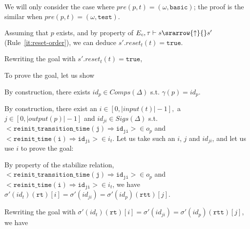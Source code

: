 \documentclass[dvipsnames,12pt]{article}
\begin{document}
\begin{niproof}
\begin{itemize}
\begin{itemize}
\begin{itemize}
        We will only consider the case where
        $pre(p,t)=(\omega,\mathtt{basic})$; the proof is the similar
        when $pre(p,t)=(\omega,\mathtt{test})$.

        Assuming that $p$ exists, and by property of
        $E_c,\tau\vdash{}s\srarrow{\uparrow}{\fontsize{7}{7}\selectfont}s'$
        (Rule~\ref{it:reset-order}), we can deduce
        $s'.reset_t(t)=\mathtt{true}$.

        Rewriting the goal with $s'.reset_t(t)=\mathtt{true}$,

        \noindent{}To prove the goal, let us show

        By construction, there exists $id_p\in{}Comps(\Delta)$
        s.t. $\gamma(p)=id_p$.

        \exP{}

        By construction, there exist an
        $i\in{}[0,\vert{}input(t)\vert-1],$ a
        $j\in[0,\vert{}output(p)\vert-1]$ and
        $id_{ji}\in{}Sigs(\Delta)$ s.t.
        ${<}\mathtt{reinit\_transition\_time(j)\Rightarrow{}id_{ji}}{>}\in{}o_p$
        and\\
        ${<}\mathtt{reinit\_time(i)\Rightarrow{}id_{ji}}{>}\in{}i_t$. Let
        us take such an $i$, $j$ and $id_{ji}$, and let us use $i$ to
        prove the goal: 

        By property of the stabilize relation,
        ${<}\mathtt{reinit\_transition\_time(j)\Rightarrow{}id_{ji}}{>}\in{}o_p$
        and
        ${<}\mathtt{reinit\_time(i)\Rightarrow{}id_{ji}}{>}\in{}i_t$,
        we have
        $\sigma'(id_t)(\texttt{rt})[i]=\sigma'(id_{ji})=\sigma'(id_p)(\texttt{rtt})[j]$.

        Rewriting the goal with
        $\sigma'(id_t)(\texttt{rt})[i]=\sigma'(id_{ji})=\sigma'(id_p)(\texttt{rtt})[j]$, we have\\


\end{itemize}
\end{itemize}
\end{itemize}
\end{niproof}
\end{document}
